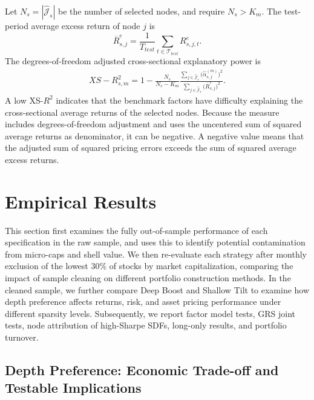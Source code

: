 \documentclass[12pt]{article}
\def\mathrm#1{#1}%
\def\text#1{#1}%
\begin{document}
Let \(N_s=|\widehat{\mathcal J}_s|\) be the number of selected nodes, and require \(N_s>K_m\). The test-period average excess return of node \(j\) is
\begin{equation}
  \overline R_{s,j}^{e}
  =
  \frac{1}{T_{\mathrm{test}}}
  \sum_{t\in\mathcal T_{\mathrm{test}}}
  R_{s,j,t}^{e}.
  \label{eq:node_mean_excess_return}
\end{equation}
The degrees-of-freedom adjusted cross-sectional explanatory power is
\begin{equation}
  \begin{aligned}
  \mathrm{XS}\text{-}R_{s,m}^{2}
  =1-
  \frac{N_s}{N_s-K_m}
  \frac{
    \displaystyle
    \sum_{j\in\widehat{\mathcal J}_s}
    \bigl(\widehat\alpha_{s,j}^{(m)}\bigr)^2
  }{
    \displaystyle
    \sum_{j\in\widehat{\mathcal J}_s}
    \bigl(\overline R_{s,j}^{e}\bigr)^2
  }.
  \end{aligned}
  \label{eq:xs_r2}
\end{equation}
A low XS-\(R^2\) indicates that the benchmark factors have difficulty explaining the cross-sectional average returns of the selected nodes. Because the measure includes degrees-of-freedom adjustment and uses the uncentered sum of squared average returns as denominator, it can be negative. A negative value means that the adjusted sum of squared pricing errors exceeds the sum of squared average excess returns.

\clearpage

\section{Empirical Results}
\label{sec:empirical_results}

This section first examines the fully out-of-sample performance of each specification in the raw sample, and uses this to identify potential contamination from micro-caps and shell value. We then re-evaluate each strategy after monthly exclusion of the lowest \(30\%\) of stocks by market capitalization, comparing the impact of sample cleaning on different portfolio construction methods. In the cleaned sample, we further compare Deep Boost and Shallow Tilt to examine how depth preference affects returns, risk, and asset pricing performance under different sparsity levels. Subsequently, we report factor model tests, GRS joint tests, node attribution of high-Sharpe SDFs, long-only results, and portfolio turnover.

\subsection{Depth Preference: Economic Trade-off and Testable Implications}
\label{subsec:depth_weight_hypothesis}
\end{document}
